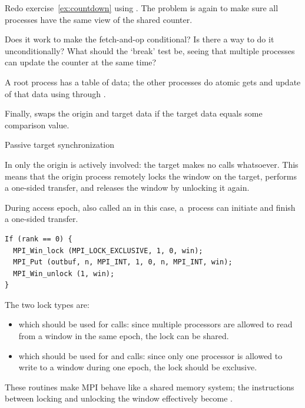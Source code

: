 \begin{exercise}
  \label{ex:countdownop}
  Redo exercise~\ref{ex:countdown} using . The
  problem is again to make sure all processes have the same view of
  the shared counter.

  Does it work to make the fetch-and-op conditional? Is there a way to
  do it unconditionally? What should the `break' test be, seeing that
  multiple processes can update the counter at the same time?
\end{exercise}

\begin{example}
  A root process has a table of data; the other processes do 
  atomic gets and update of that data using
   through .
\end{example}

Finally,  swaps the origin and
target data if the target data equals some comparison value.
%

 {Passive target synchronization}
\label{sec:passive-sync}

In  only the origin is
actively involved: the target makes no calls whatsoever.
This means that the origin process remotely locks the window
on the target, performs a one-sided transfer, and releases the window
by unlocking it again.

During access epoch, also called an
 in this case,
a~process can initiate and finish a one-sided
transfer.
\begin{lstlisting}
If (rank == 0) {
  MPI_Win_lock (MPI_LOCK_EXCLUSIVE, 1, 0, win);
  MPI_Put (outbuf, n, MPI_INT, 1, 0, n, MPI_INT, win);
  MPI_Win_unlock (1, win);
}
\end{lstlisting}
The two lock types are:
\begin{itemize}
\item {} which should be used for 
  calls: since multiple processors are allowed to read from a window
  in the same epoch, the lock can be shared.
\item {} which should be used for
   and  calls: since only one processor is
  allowed to write to a window during one epoch, the lock should be
  exclusive.
\end{itemize}
These routines make MPI behave like a shared memory system; the
instructions between locking and unlocking the window effectively
become .
%

